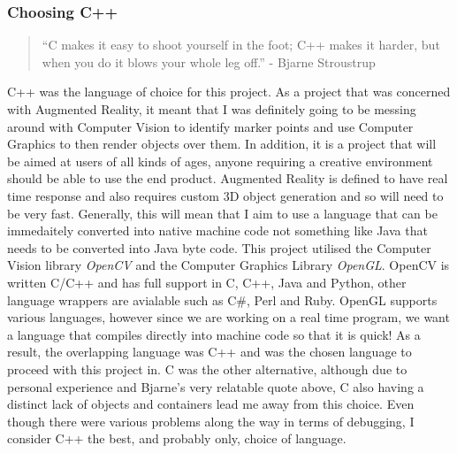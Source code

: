 \documentclass[11pt]{article}
\begin{document}
\subsubsection{Choosing C++}
\begin{quote}
“C makes it easy to shoot yourself in the foot; C++ makes it harder, 
but when you do it blows your whole leg off.” - Bjarne Stroustrup
\end{quote}

C++ was the language of choice for this project.
As a project that was concerned with Augmented Reality, it meant that I was
definitely going to be messing around with Computer Vision to 
identify marker points and use Computer Graphics to then render objects over them.
In addition, it is a project that will be aimed at users of all kinds of ages,
anyone requiring a creative environment should be able to use the end product.
Augmented Reality is defined to have real time response and also requires custom 3D 
object generation and so will need to be very fast. Generally, this will mean
that I aim to use a language that can be immedaitely converted into native
machine code not something like Java that needs to be converted into Java byte code.
This project utilised the Computer Vision library
\textit{OpenCV} and the Computer Graphics Library \textit{OpenGL}. OpenCV is written 
C/C++ and has full support in C, C++, Java and Python, other language wrappers are
avialable such as C\#, Perl and Ruby. OpenGL supports various languages, however
since we are working on a real time program, we want a language that compiles
directly into machine code so that it is quick! As a result, the overlapping
language was C++ and was the chosen language to proceed with this project in.
C was the other alternative, although due to personal experience and Bjarne's
very relatable quote above, C also having a distinct lack of objects and 
containers lead me away from this choice. Even though there
were various problems along the way in terms of debugging, I consider
C++ the best, and probably only, choice of language.
\end{document}
